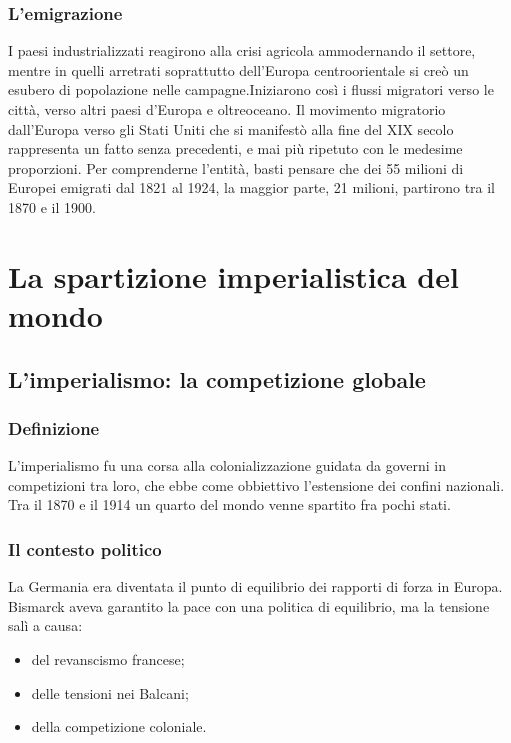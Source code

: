 \documentclass{report}
\begin{document}
\subsection{L'emigrazione}
I paesi industrializzati reagirono alla crisi agricola ammodernando il settore, mentre in quelli arretrati soprattutto dell'Europa centroorientale si creò un esubero di popolazione nelle campagne.Iniziarono così i flussi migratori verso le città, verso altri paesi d'Europa e oltreoceano. Il movimento migratorio dall'Europa verso gli Stati Uniti che si manifestò alla fine del XIX secolo rappresenta un fatto senza precedenti, e mai più ripetuto con le medesime proporzioni. Per comprenderne l'entità, basti pensare che dei 55 milioni di Europei emigrati dal 1821 al 1924, la maggior parte, 21 milioni, partirono tra il 1870 e il 1900.


\chapter{La spartizione imperialistica del mondo} %
\label{chap:La spartizione imperialistica del mondo}

\section{L'imperialismo: la competizione globale}
\subsection{Definizione}
L'imperialismo fu una corsa alla colonializzazione guidata da governi in competizioni tra loro, che ebbe come obbiettivo l'estensione dei confini nazionali. Tra il 1870 e il 1914 un quarto del mondo venne spartito fra pochi stati.

\subsection{Il contesto politico}
La Germania era diventata il punto di equilibrio dei rapporti di forza in Europa. Bismarck aveva garantito la pace con una politica di equilibrio, ma la tensione salì a causa:
\begin{itemize}
  \item del revanscismo francese;
  \item delle tensioni nei Balcani;
  \item della competizione coloniale.
\end{itemize}
\end{document}
